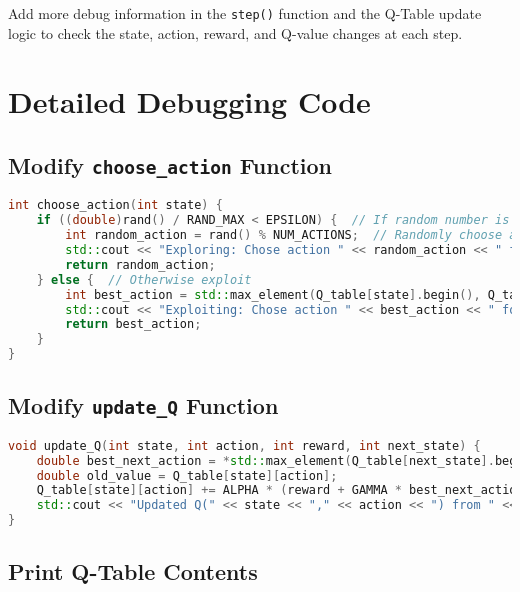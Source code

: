 \documentclass{article}
\begin{document}
Add more debug information in the \texttt{step()} function and the Q-Table update logic to check the state, action, reward, and Q-value changes at each step.

\section*{Detailed Debugging Code}

\subsection*{Modify \texttt{choose\_action} Function}

\begin{lstlisting}[language=C++]
int choose_action(int state) {
    if ((double)rand() / RAND_MAX < EPSILON) {  // If random number is less than epsilon, explore
        int random_action = rand() % NUM_ACTIONS;  // Randomly choose an action
        std::cout << "Exploring: Chose action " << random_action << " for state " << state << std::endl;
        return random_action;
    } else {  // Otherwise exploit
        int best_action = std::max_element(Q_table[state].begin(), Q_table[state].end()) - Q_table[state].begin();  // Choose action with max Q-value
        std::cout << "Exploiting: Chose action " << best_action << " for state " << state << std::endl;
        return best_action;
    }
}
\end{lstlisting}

\subsection*{Modify \texttt{update\_Q} Function}

\begin{lstlisting}[language=C++]
void update_Q(int state, int action, int reward, int next_state) {
    double best_next_action = *std::max_element(Q_table[next_state].begin(), Q_table[next_state].end());  // Find max Q-value for next state
    double old_value = Q_table[state][action];
    Q_table[state][action] += ALPHA * (reward + GAMMA * best_next_action - Q_table[state][action]);  // Update Q-value using Q-Learning formula
    std::cout << "Updated Q(" << state << "," << action << ") from " << old_value << " to " << Q_table[state][action] << std::endl;
}
\end{lstlisting}

\subsection*{Print Q-Table Contents}
\end{document}
